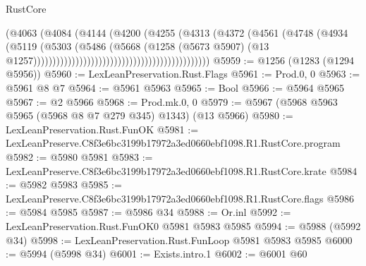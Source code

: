 \begin{lexlean}{RustCore}
\begin{coremodule}
                                                                (@4063
                                                                  (@4084
                                                                    (@4144
                                                                      (@4200
                                                                        (@4255
                                                                          (@4313
                                                                            (@4372
                                                                              (@4561
                                                                                (@4748
                                                                                  (@4934
                                                                                    (@5119
                                                                                      (@5303
                                                                                        (@5486
                                                                                          (@5668
                                                                                            (@1258
                                                                                              (@5673
                                                                                                @5907)
                                                                                              (@13
                                                                                                @1257))))))))))))))))))))))))))))))))))))))))))))))
@5959 := @1256 (@1283 (@1294 @5956))
@5960 := LexLeanPreservation.Rust.Flags
@5961 := Prod.{0, 0}
@5963 := @5961 @8 @7
@5964 := @5961 @5963
@5965 := Bool
@5966 := @5964 @5965
@5967 := @2 @5966
@5968 := Prod.mk.{0, 0}
@5979 := @5967 (@5968 @5963 @5965 (@5968 @8 @7 @279 @345) @1343) (@13 @5966)
@5980 := LexLeanPreservation.Rust.FunOK
@5981 := LexLeanPreserve.C8f3e6bc3199b17972a3ed0660ebf1098.R1.RustCore.program
@5982 := @5980 @5981
@5983 := LexLeanPreserve.C8f3e6bc3199b17972a3ed0660ebf1098.R1.RustCore.krate
@5984 := @5982 @5983
@5985 := LexLeanPreserve.C8f3e6bc3199b17972a3ed0660ebf1098.R1.RustCore.flags
@5986 := @5984 @5985
@5987 := @5986 @34
@5988 := Or.inl
@5992 := LexLeanPreservation.Rust.FunOK0 @5981 @5983 @5985
@5994 := @5988 (@5992 @34)
@5998 := LexLeanPreservation.Rust.FunLoop @5981 @5983 @5985
@6000 := @5994 (@5998 @34)
@6001 := Exists.intro.{1}
@6002 := @6001 @60

\end{coremodule}
\end{lexlean}
